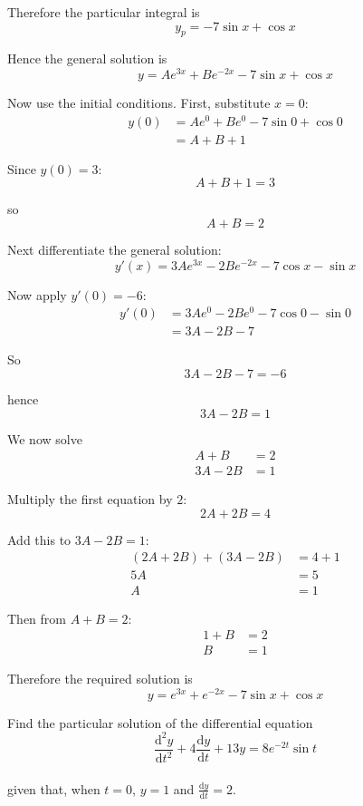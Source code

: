 \documentclass[leqno]{article}
\begin{document}
\begin{enumerate}[
  label=\textbf{\arabic*.},
  leftmargin=*,
  topsep=0pt,
  partopsep=0pt,
  parsep=0pt
]
\begin{djsSolution}
Therefore the particular integral is
\[
y_p=-7\sin x+\cos x
\]

Hence the general solution is
\[
y=Ae^{3x}+Be^{-2x}-7\sin x+\cos x
\]

Now use the initial conditions. First, substitute \(x=0\):
\begin{align*}
y(0)&=Ae^0+Be^0-7\sin 0+\cos 0 \\
&=A+B+1
\end{align*}

Since \(y(0)=3\):
\[
A+B+1=3
\]

so
\[
A+B=2
\]

Next differentiate the general solution:
\[
y'(x)=3Ae^{3x}-2Be^{-2x}-7\cos x-\sin x
\]

Now apply \(y'(0)=-6\):
\begin{align*}
y'(0)&=3Ae^0-2Be^0-7\cos 0-\sin 0 \\
&=3A-2B-7
\end{align*}

So
\[
3A-2B-7=-6
\]

hence
\[
3A-2B=1
\]

We now solve
\begin{align*}
A+B&=2 \\
3A-2B&=1
\end{align*}

Multiply the first equation by \(2\):
\[
2A+2B=4
\]

Add this to \(3A-2B=1\):
\begin{align*}
(2A+2B)+(3A-2B)&=4+1 \\
5A&=5 \\
A&=1
\end{align*}

Then from \(A+B=2\):
\begin{align*}
1+B&=2 \\
B&=1
\end{align*}

Therefore the required solution is
\[
y=e^{3x}+e^{-2x}-7\sin x+\cos x
\]
\end{djsSolution}


\newpage

\questionitem

Find the particular solution of the differential equation \\
\[
\frac{\mathrm{d}^2 y}{\mathrm{d}t^2}+4\frac{\mathrm{d}y}{\mathrm{d}t}+13y=8e^{-2t}\sin t
\] \\
given that, when $t=0$, $y=1$ and $\frac{\mathrm{d}y}{\mathrm{d}t}=2$. 


\end{enumerate}
\end{document}
